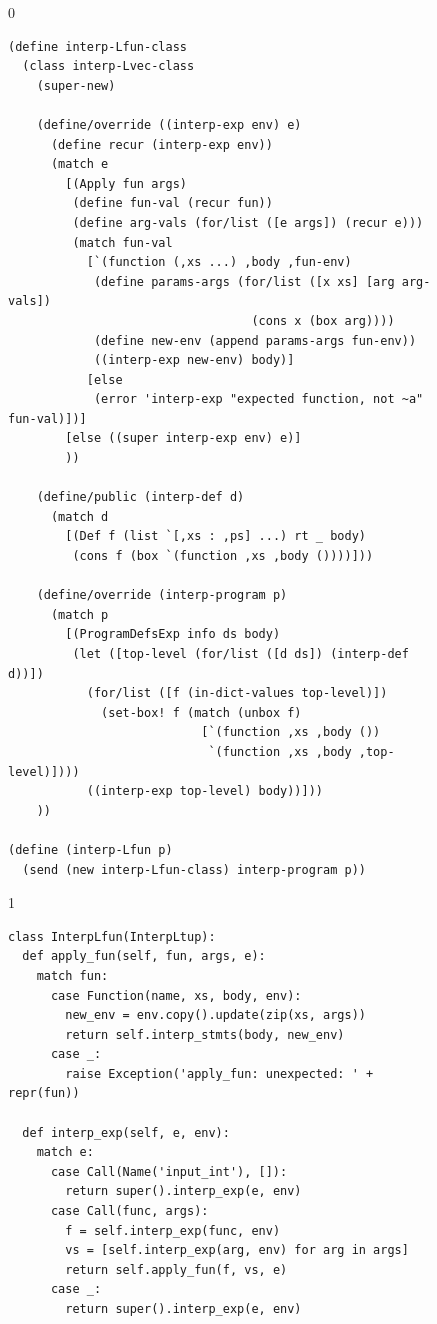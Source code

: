 \documentclass[7x10]{TimesAPriori_MIT}%
\def\racketEd{0}
\def\pythonEd{1}
\def\edition{1}
\newcommand{\pythonColor}[0]{}
\numberwithin{theorem}{chapter}
\numberwithin{definition}{chapter}
\numberwithin{equation}{chapter}
\begin{document}
\begin{figure}[tp]
  \begin{tcolorbox}[colback=white]
    {\if\edition\racketEd  
\begin{lstlisting}
(define interp-Lfun-class
  (class interp-Lvec-class
    (super-new)

    (define/override ((interp-exp env) e)
      (define recur (interp-exp env))
      (match e
        [(Apply fun args)
         (define fun-val (recur fun))
         (define arg-vals (for/list ([e args]) (recur e)))
         (match fun-val
           [`(function (,xs ...) ,body ,fun-env)
            (define params-args (for/list ([x xs] [arg arg-vals])
                                  (cons x (box arg))))
            (define new-env (append params-args fun-env))
            ((interp-exp new-env) body)]
           [else
            (error 'interp-exp "expected function, not ~a" fun-val)])]
        [else ((super interp-exp env) e)]
        ))

    (define/public (interp-def d)
      (match d
        [(Def f (list `[,xs : ,ps] ...) rt _ body)
         (cons f (box `(function ,xs ,body ())))]))

    (define/override (interp-program p)
      (match p
        [(ProgramDefsExp info ds body)
         (let ([top-level (for/list ([d ds]) (interp-def d))])
           (for/list ([f (in-dict-values top-level)])
             (set-box! f (match (unbox f)
                           [`(function ,xs ,body ())
                            `(function ,xs ,body ,top-level)])))
           ((interp-exp top-level) body))]))
    ))

(define (interp-Lfun p)
  (send (new interp-Lfun-class) interp-program p))
\end{lstlisting}
\fi}
{\if\edition\pythonEd\pythonColor
\begin{lstlisting}
class InterpLfun(InterpLtup):
  def apply_fun(self, fun, args, e):
    match fun:
      case Function(name, xs, body, env):
        new_env = env.copy().update(zip(xs, args))
        return self.interp_stmts(body, new_env)
      case _:
        raise Exception('apply_fun: unexpected: ' + repr(fun))
    
  def interp_exp(self, e, env):
    match e:
      case Call(Name('input_int'), []):
        return super().interp_exp(e, env)      
      case Call(func, args):
        f = self.interp_exp(func, env)
        vs = [self.interp_exp(arg, env) for arg in args]
        return self.apply_fun(f, vs, e)
      case _:
        return super().interp_exp(e, env)


\end{lstlisting}}
\end{tcolorbox}
\end{figure}
\end{document}
